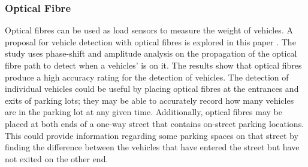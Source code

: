 \subsubsection*{Optical Fibre}
Optical fibres can be used as load sensors to measure the weight of vehicles. A proposal for vehicle detection with optical fibres is explored in this paper \citep{gupta_automated_2016}. The study uses phase-shift and amplitude analysis on the propagation of the optical fibre path to detect when a vehicles' is on it. The results show that optical fibres produce a high accuracy rating for the detection of vehicles. The detection of individual vehicles could be useful by placing optical fibres at the entrances and exits of parking lots; they may be able to accurately record how many vehicles are in the parking lot at any given time. Additionally, optical fibres may be placed at both ends of a one-way street that contains on-street parking locations. This could provide information regarding some parking spaces on that street by finding the difference between the vehicles that have entered the street but have not exited on the other end.